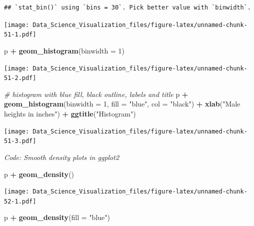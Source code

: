\documentclass[
]{article}
\newenvironment{Shaded}{\begin{snugshade}}{\end{snugshade}}
\newcommand{\CommentTok}[1]{\textcolor[rgb]{0.56,0.35,0.01}{\textit{#1}}}
\newcommand{\DataTypeTok}[1]{\textcolor[rgb]{0.13,0.29,0.53}{#1}}
\newcommand{\DecValTok}[1]{\textcolor[rgb]{0.00,0.00,0.81}{#1}}
\newcommand{\KeywordTok}[1]{\textcolor[rgb]{0.13,0.29,0.53}{\textbf{#1}}}
\newcommand{\NormalTok}[1]{#1}
\newcommand{\OperatorTok}[1]{\textcolor[rgb]{0.81,0.36,0.00}{\textbf{#1}}}
\newcommand{\StringTok}[1]{\textcolor[rgb]{0.31,0.60,0.02}{#1}}
\begin{document}
\begin{verbatim}
## `stat_bin()` using `bins = 30`. Pick better value with `binwidth`.
\end{verbatim}

\texttt{[image: Data\_Science\_Visualization\_files/figure-latex/unnamed-chunk-51-1.pdf]}

\begin{Shaded}
\begin{Highlighting}[]
\NormalTok{p }\OperatorTok{+}\StringTok{ }\KeywordTok{geom_histogram}\NormalTok{(}\DataTypeTok{binwidth =} \DecValTok{1}\NormalTok{)}
\end{Highlighting}
\end{Shaded}

\texttt{[image: Data\_Science\_Visualization\_files/figure-latex/unnamed-chunk-51-2.pdf]}

\begin{Shaded}
\begin{Highlighting}[]
\CommentTok{# histogram with blue fill, black outline, labels and title}
\NormalTok{p }\OperatorTok{+}\StringTok{ }\KeywordTok{geom_histogram}\NormalTok{(}\DataTypeTok{binwidth =} \DecValTok{1}\NormalTok{, }\DataTypeTok{fill =} \StringTok{"blue"}\NormalTok{, }\DataTypeTok{col =} \StringTok{"black"}\NormalTok{) }\OperatorTok{+}
\StringTok{    }\KeywordTok{xlab}\NormalTok{(}\StringTok{"Male heights in inches"}\NormalTok{) }\OperatorTok{+}
\StringTok{    }\KeywordTok{ggtitle}\NormalTok{(}\StringTok{"Histogram"}\NormalTok{)}
\end{Highlighting}
\end{Shaded}

\texttt{[image: Data\_Science\_Visualization\_files/figure-latex/unnamed-chunk-51-3.pdf]}

\emph{Code: Smooth density plots in ggplot2}

\begin{Shaded}
\begin{Highlighting}[]
\NormalTok{p }\OperatorTok{+}\StringTok{ }\KeywordTok{geom_density}\NormalTok{()}
\end{Highlighting}
\end{Shaded}

\texttt{[image: Data\_Science\_Visualization\_files/figure-latex/unnamed-chunk-52-1.pdf]}

\begin{Shaded}
\begin{Highlighting}[]
\NormalTok{p }\OperatorTok{+}\StringTok{ }\KeywordTok{geom_density}\NormalTok{(}\DataTypeTok{fill =} \StringTok{"blue"}\NormalTok{)}
\end{Highlighting}
\end{Shaded}
\end{document}
